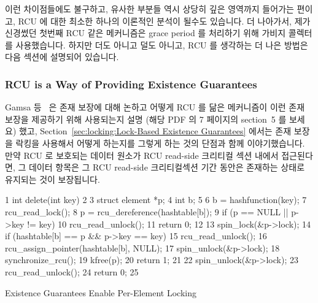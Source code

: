 이런 차이점들에도 불구하고, 유사한 부분들 역시 상당히 깊은 영역까지 들어가는
편이고, RCU 에 대한 최소한 하나의 이론적인 분석이 될수도 있습니다.
더 나아가서, 제가 신경썼던 첫번째 RCU 같은 메커니즘은 grace period 를 처리하기
위해 가비지 콜렉터를 사용했습니다.
하지만 더도 아니고 덜도 아니고, RCU 를 생각하는 더 나은 방법은 다음 섹션에
설명되어 있습니다.

\subsubsection{RCU is a Way of Providing Existence Guarantees}
\label{sec:defer:RCU is a Way of Providing Existence Guarantees}

Gamsa 등~\cite{Gamsa99} 은 존재 보장에 대해 논하고 어떻게 RCU 를 닮은
메커니즘이 이런 존재 보장을 제공하기 위해 사용되는지 설명 (해당 PDF 의 7
페이지의 section~5 를 보세요) 했고,
Section~\ref{sec:locking:Lock-Based Existence Guarantees} 에서는 존재 보장을
락킹을 사용해서 어떻게 하는지를 그렇게 하는 것의 단점과 함께 이야기했습니다.
만약 RCU 로 보호되는 데이터 원소가 RCU read-side 크리티컬 섹션 내에서
접근된다면, 그 데이터 항목은 그 RCU read-side 크리티컬섹션 기간 동안은 존재하는
상태로 유지되는 것이 보장됩니다.

\begin{listing}[tbp]
{ \scriptsize
\begin{verbbox}
  1 int delete(int key)
  2 {
  3   struct element *p;
  4   int b;
  5 
  6   b = hashfunction(key);
  7   rcu_read_lock();
  8   p = rcu_dereference(hashtable[b]);
  9   if (p == NULL || p->key != key) {
 10     rcu_read_unlock();
 11     return 0;
 12   }
 13   spin_lock(&p->lock);
 14   if (hashtable[b] == p && p->key == key) {
 15     rcu_read_unlock();
 16     rcu_assign_pointer(hashtable[b], NULL);
 17     spin_unlock(&p->lock);
 18     synchronize_rcu();
 19     kfree(p);
 20     return 1;
 21   }
 22   spin_unlock(&p->lock);
 23   rcu_read_unlock();
 24   return 0;
 25 }
\end{verbbox}
}
\centering
\theverbbox
\caption{Existence Guarantees Enable Per-Element Locking}
\label{lst:defer:Existence Guarantees Enable Per-Element Locking}
\end{listing}

